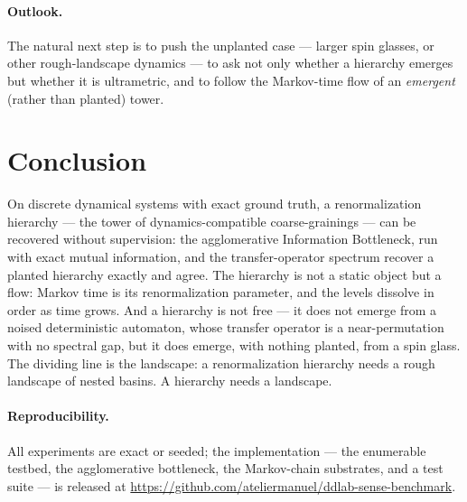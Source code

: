 \documentclass[11pt]{article}
\begin{document}
\paragraph{Outlook.}
The natural next step is to push the unplanted case --- larger spin glasses, or
other rough-landscape dynamics --- to ask not only whether a hierarchy emerges
but whether it is ultrametric, and to follow the Markov-time flow of an
\emph{emergent} (rather than planted) tower.

\section{Conclusion}
\label{sec:conclusion}

On discrete dynamical systems with exact ground truth, a renormalization
hierarchy --- the tower of dynamics-compatible coarse-grainings --- can be
recovered without supervision: the agglomerative Information Bottleneck, run
with exact mutual information, and the transfer-operator spectrum recover a
planted hierarchy exactly and agree. The hierarchy is not a static object but a
flow: Markov time is its renormalization parameter, and the levels dissolve in
order as time grows. And a hierarchy is not free --- it does not emerge from a
noised deterministic automaton, whose transfer operator is a near-permutation
with no spectral gap, but it does emerge, with nothing planted, from a spin
glass. The dividing line is the landscape: a renormalization hierarchy needs a
rough landscape of nested basins. A hierarchy needs a landscape.

\paragraph{Reproducibility.}
All experiments are exact or seeded; the implementation --- the enumerable
testbed, the agglomerative bottleneck, the Markov-chain substrates, and a test
suite --- is released at
\url{https://github.com/ateliermanuel/ddlab-sense-benchmark}.



\end{document}
